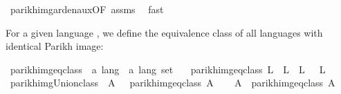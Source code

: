 \begin{isabellebody}
\ parikh{\isacharunderscore}{\kern0pt}img{\isacharunderscore}{\kern0pt}arden{\isacharunderscore}{\kern0pt}aux{\isacharbrackleft}{\kern0pt}OF\ assms{\isacharbrackright}{\kern0pt}\ \isamarkupfalse%
\ fast\isanewline
{}\isamarkupfalse%
%
\endisatagproof
{\isafoldproof}%
%
\isadelimproof
%
\endisadelimproof
%
\isadelimdocument
%
\endisadelimdocument
%
\isatagdocument
%
\isamarkuptrue%
%
\endisatagdocument
{\isafolddocument}%
%
\isadelimdocument
%
\endisadelimdocument
%
\begin{isamarkuptext}%
\label{sec:parikh_eq_class}%
\end{isamarkuptext}\isamarkuptrue%
%
\begin{isamarkuptext}%
For a given language , we define the equivalence class of all languages with identical Parikh
image:%
\end{isamarkuptext}\isamarkuptrue%
\isamarkupfalse%
\ parikh{\isacharunderscore}{\kern0pt}img{\isacharunderscore}{\kern0pt}eq{\isacharunderscore}{\kern0pt}class\ {\isacharcolon}{\kern0pt}{\isacharcolon}{\kern0pt}\ {\isachardoublequoteopen}{\isacharprime}{\kern0pt}a\ lang\ {\isasymRightarrow}\ {\isacharprime}{\kern0pt}a\ lang\ set{\isachardoublequoteclose}\ \isanewline
\ \ {\isachardoublequoteopen}parikh{\isacharunderscore}{\kern0pt}img{\isacharunderscore}{\kern0pt}eq{\isacharunderscore}{\kern0pt}class\ L\ {\isasymequiv}\ {\isacharbraceleft}{\kern0pt}L{\isacharprime}{\kern0pt}{\isachardot}{\kern0pt}\ {\isasymPsi}\ L{\isacharprime}{\kern0pt}\ {\isacharequal}{\kern0pt}\ {\isasymPsi}\ L{\isacharbraceright}{\kern0pt}{\isachardoublequoteclose}\isanewline
\isanewline
{}\isamarkupfalse%
\ parikh{\isacharunderscore}{\kern0pt}img{\isacharunderscore}{\kern0pt}Union{\isacharunderscore}{\kern0pt}class{\isacharcolon}{\kern0pt}\ {\isachardoublequoteopen}{\isasymPsi}\ A\ {\isacharequal}{\kern0pt}\ {\isasymPsi}\ {\isacharparenleft}{\kern0pt}{\isasymUnion}{\isacharparenleft}{\kern0pt}parikh{\isacharunderscore}{\kern0pt}img{\isacharunderscore}{\kern0pt}eq{\isacharunderscore}{\kern0pt}class\ A{\isacharparenright}{\kern0pt}{\isacharparenright}{\kern0pt}{\isachardoublequoteclose}\isanewline
%
\isadelimproof
%
\endisadelimproof
%
\isatagproof
{}\isamarkupfalse%
\isanewline
\ \ \isamarkupfalse%
\ {\isacharquery}{\kern0pt}A{\isacharprime}{\kern0pt}\ {\isacharequal}{\kern0pt}\ {\isachardoublequoteopen}{\isasymUnion}{\isacharparenleft}{\kern0pt}parikh{\isacharunderscore}{\kern0pt}img{\isacharunderscore}{\kern0pt}eq{\isacharunderscore}{\kern0pt}class\ A{\isacharparenright}{\kern0pt}{\isachardoublequoteclose}\isanewline

\end{isabellebody}

